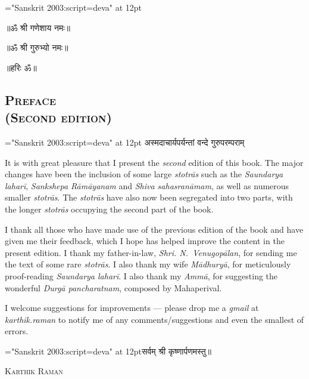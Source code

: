 {\font \x="Sanskrit 2003:script=deva" at 12pt\x
\centerline{॥ॐ श्री गणेशाय नमः॥}
\centerline{॥ॐ श्री गुरुभ्यो नमः॥}
\centerline{॥हरिः ॐ॥}
}
\thispagestyle{empty}

\begin{center}
\chapter*{\texorpdfstring{\scshape{Preface\\(Second edition)}}{Preface\\(Second edition)}}
\end{center}

{\font \x="Sanskrit 2003:script=deva" at 12pt\x
{}
{अस्मदाचार्यपर्यन्तां वन्दे गुरुपरम्पराम्}
}

It is with great pleasure that I present the \emph{second} edition of this book. The major changes  have been the inclusion of some large \emph{stotrās} such as the \emph{Saundarya laharī}, \emph{Sankshepa Rāmāyanam} and \emph{Shiva sahasranāmam}, as well as numerous smaller \emph{stotrās}. The \emph{stotrās} have also now been segregated into two parts, with the longer \emph{stotrās} occupying the second part of the book.

I thank all those who have made use of the previous edition of the book and have given me their feedback, which I hope has helped improve the content in the present edition. I thank my father-in-law, \textit{Shri. N.~Venugopālan}, for sending me the text of some rare \emph{stotrās}. I also thank my wife \textit{Mādhuryā}, for meticulously proof-reading \emph{Saundarya laharī}. I also thank my \textit{Ammā}, for suggesting the wonderful \textit{Durgā pancharatnam}, composed by Mahaperival.

I welcome suggestions for improvements --- please drop me a \textit{gmail} at \textit{karthik.raman} to notify me of any comments/suggestions and even the smallest of errors.

\centerline{\font \x="Sanskrit 2003:script=deva" at 12pt\x सर्वम् श्री कृष्णार्पणमस्तु॥}

\medskip
{} \hfill \textsc{Karthik Raman}
